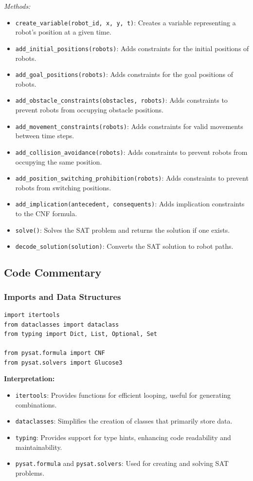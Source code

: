 \documentclass[8pt]{article}
\begin{document}
\emph{Methods:}
\begin{itemize}
    \item \texttt{create\_variable(robot\_id, x, y, t)}: Creates a variable representing a robot's position at a given time.
    \item \texttt{add\_initial\_positions(robots)}: Adds constraints for the initial positions of robots.
    \item \texttt{add\_goal\_positions(robots)}: Adds constraints for the goal positions of robots.
    \item \texttt{add\_obstacle\_constraints(obstacles, robots)}: Adds constraints to prevent robots from occupying obstacle positions.
    \item \texttt{add\_movement\_constraints(robots)}: Adds constraints for valid movements between time steps.
    \item \texttt{add\_collision\_avoidance(robots)}: Adds constraints to prevent robots from occupying the same position.
    \item \texttt{add\_position\_switching\_prohibition(robots)}: Adds constraints to prevent robots from switching positions.
    \item \texttt{add\_implication(antecedent, consequents)}: Adds implication constraints to the CNF formula.
    \item \texttt{solve()}: Solves the SAT problem and returns the solution if one exists.
    \item \texttt{decode\_solution(solution)}: Converts the SAT solution to robot paths.
\end{itemize}

\subsection{Code Commentary}

\subsubsection*{Imports and Data Structures}

\begin{lstlisting}
import itertools
from dataclasses import dataclass
from typing import Dict, List, Optional, Set

from pysat.formula import CNF
from pysat.solvers import Glucose3
\end{lstlisting}

\textbf{Interpretation:}
\begin{itemize}
    \item \texttt{itertools}: Provides functions for efficient looping, useful for generating combinations.
    \item \texttt{dataclasses}: Simplifies the creation of classes that primarily store data.
    \item \texttt{typing}: Provides support for type hints, enhancing code readability and maintainability.
    \item \texttt{pysat.formula} and \texttt{pysat.solvers}: Used for creating and solving SAT problems.
\end{itemize}
\end{document}
